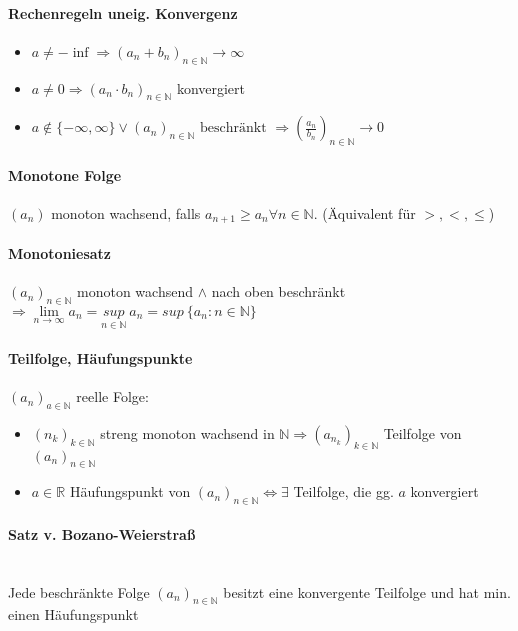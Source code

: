 \documentclass[paper=a3,paper=landscape, fontsize=9pt,DIV=25]{scrartcl}
\newcommand{\real}{{\mathbb{R}}}
\newcommand{\nat}{\mathbb{N}}
\newcommand{\aseq}{(a_n)_{n \in \nat}}
\begin{document}
\begin{multicols*}{4}
  \paragraph{Rechenregeln uneig. Konvergenz}
  \begin{itemize}
  \item $a \neq -\inf \Rightarrow (a_n+b_n)_{n \in \nat} \rightarrow \infty$
  \item $a \neq 0 \Rightarrow (a_n \cdot b_n)_{n \in \nat}$ konvergiert
  \item $a \notin \{-\infty, \infty\} \vee\aseq \text{ beschränkt } \Rightarrow (\frac{a_n}{b_n})_{n \in \nat} \rightarrow 0$
  \end{itemize}


  \paragraph{Monotone Folge}
  $(a_n)$ monoton wachsend, falls $a_{n+1} \geq a_n \forall n \in \nat$. (Äquivalent für $>,<,\leq$)


  \paragraph{Monotoniesatz}
  $\aseq$ monoton wachsend $\wedge$ nach oben beschränkt $\Rightarrow \lim\limits_{n \rightarrow \infty} a_n = \underset{n \in \nat}{sup}\:a_n = sup\:\{a_n:n \in \nat\}$

  \paragraph{Teilfolge, Häufungspunkte}
  $(a_n)_{a \in \nat}$ reelle Folge:
  \begin{itemize}
  \item $(n_k)_{k \in \nat}$ streng monoton wachsend in $\nat \Rightarrow (a_{n_k})_{k \in \nat}$ Teilfolge von $\aseq$
  \item $a \in \real$ Häufungspunkt von $\aseq \Leftrightarrow \exists$ Teilfolge, die gg. $a$ konvergiert
  \end{itemize}


  \paragraph{Satz v. Bozano-Weierstraß}\hspace{0pt} \\
  Jede beschränkte Folge $\aseq$ besitzt eine konvergente Teilfolge und hat min. einen Häufungspunkt



\end{multicols*}
\end{document}
